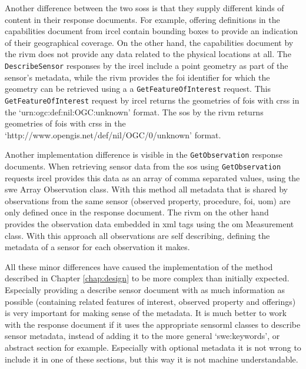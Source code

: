 \begin{sloppypar}
Another difference between the two \aclp{sos} is that they supply different kinds of content in their response documents. For example, offering definitions in the capabilities document from \ac{ircel} contain bounding boxes to provide an indication of their geographical coverage. On the other hand, the capabilities document by the \ac{rivm} does not provide any data related to the physical locations at all. The \texttt{DescribeSensor} responses by the \ac{ircel} include a point geometry as part of the sensor's metadata, while the \ac{rivm} provides the \ac{foi} identifier for which the geometry can be retrieved using a a \texttt{GetFeatureOfInterest} request. This \texttt{GetFeatureOfInterest} request by \ac{ircel} returns the geometries of \acp{foi} with \acp{crs} in the `urn:ogc:def:nil:OGC:unknown' format. The \ac{sos} by the \ac{rivm} returns geometries of \acp{foi} with \acp{crs} in the `http://www.opengis.net/def/nil/OGC/0/unknown' format. 
\end{sloppypar}

\begin{sloppypar}
Another implementation difference is visible in the \texttt{GetObservation} response documents. When retrieving sensor data from the \ac{sos} using \texttt{GetObservation} requests \ac{ircel} provides this data as an array of comma separated values, using the \ac{swe} Array Observation class. With this method all metadata that is shared by observations from the same sensor (observed property, procedure, \ac{foi}, \ac{uom}) are only defined once in the response document. The \ac{rivm} on the other hand provides the observation data embedded in \ac{xml} tags using the \ac{om} Measurement class. With this approach all observations are self describing, defining the metadata of a sensor for each observation it makes.   
\end{sloppypar}

All these minor differences have caused the implementation of the method described in Chapter \ref{chap:design} to be more complex than initially expected. Especially providing a describe sensor document with as much information as possible (containing related features of interest, observed property and offerings) is very important for making sense of the metadata. It is much better to work with the response document if it uses the appropriate \ac{sensorml} classes to describe sensor metadata, instead of adding it to the more general `swe:keywords', or abstract section for example. Especially with optional metadata it is not wrong to include it in one of these sections, but this way it is not machine understandable. 

